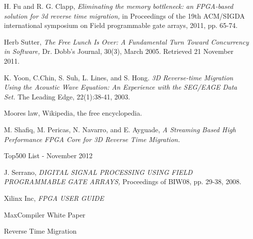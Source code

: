 \begin{thebibliography}{9}
     H. Fu and R. G. Clapp, \emph{Eliminating the memory
    bottleneck: an FPGA-based solution for 3d reverse time migration,}
    in Proceedings of the 19th ACM/SIGDA international symposium on Field
    programmable gate arrays, 2011, pp. 65-74.

     Herb Sutter, \emph{The Free Lunch Is Over: A Fundamental
    Turn Toward Concurrency in Software,} Dr. Dobb's Journal, 30(3), March
    2005. Retrieved 21 November 2011.

     K. Yoon, C.Chin, S. Suh, L. Lines, and S. Hong.
    \emph{3D Reverse-time Migration Using the Acoustic Wave Equation:
    An Experience with the SEG/EAGE Data Set.} The Leading Edge, 22(1):38-41,
    2003.

     Moores law, Wikipedia, the free encyclopedia.

     M. Shafiq, M. Pericas, N. Navarro, and E. Ayguade,
    \emph{A Streaming Based High Performance FPGA Core for 3D Reverse
    Time Migration.}

     Top500 List - November 2012

    J. Serrano,
    \emph{DIGITAL SIGNAL PROCESSING USING FIELD PROGRAMMABLE GATE ARRAYS,}
    Proceedings of BIW08, pp. 29-38, 2008.

    Xilinx Inc,
    \emph{FPGA USER GUIDE}

    MaxCompiler White Paper

    Reverse Time Migration

\end{thebibliography}
